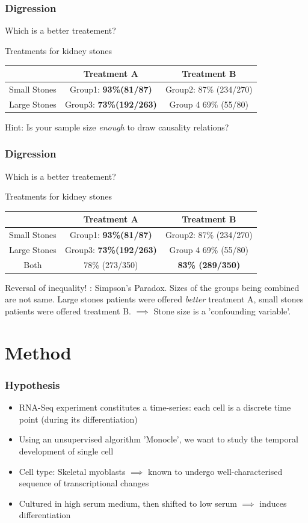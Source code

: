 \documentclass[10pt]{beamer}
\begin{document}
\begin{frame}[fragile]
	\frametitle{Digression}
	Which is a better treatement?
	
	Treatments for kidney stones
	
	\begin{tabular}{|c|c|c|}
		\hline  & Treatment A  & Treatment B  \\ 
		\hline Small Stones & Group1: \textbf{93\%(81/87) } & Group2: 87\% (234/270)  \\ 
		\hline Large Stones & Group3: \textbf{73\%(192/263)} & Group 4
		69\% (55/80)  \\ 
		\hline 
	\end{tabular}
	\pause
	
	Hint: Is your sample size \emph{enough} to draw causality relations? 

\end{frame}


\begin{frame}[fragile]
	\frametitle{Digression}
	Which is a better treatement?
	
	Treatments for kidney stones
	
	\begin{tabular}{|c|c|c|}
		\hline  & Treatment A  & Treatment B  \\ 
		\hline Small Stones & Group1: \textbf{93\%(81/87) } & Group2: 87\% (234/270)  \\ 
		\hline Large Stones & Group3: \textbf{73\%(192/263)} & Group 4
		69\% (55/80)  \\ 
		\hline Both & 78\% (273/350) &	\textbf{83\% (289/350)} \\ 
		\hline 
	\end{tabular} 
	
	Reversal of inequality! : Simpson's Paradox. 
	Sizes of the groups being combined are not same. Large stones patients were offered \emph{better} treatment A, small stones patients were offered treatment B. $\implies$	Stone size is a 'confounding variable'.
	
\end{frame}


\section{Method}

\begin{frame}[fragile]
	\frametitle{Hypothesis}
	\begin{itemize}[<+- | alert@+>]
		\item RNA-Seq experiment constitutes a time-series: each cell is a discrete time point (during its differentiation)
		\item Using an unsupervised algorithm 'Monocle', we want to study the temporal development of single cell
		\item Cell type: Skeletal myoblasts $\implies$ known to undergo well-characterised sequence of transcriptional changes
		\item Cultured in high serum medium, then shifted to low serum $\implies$ induces differentiation 
	\end{itemize}
\end{frame}
\end{document}
